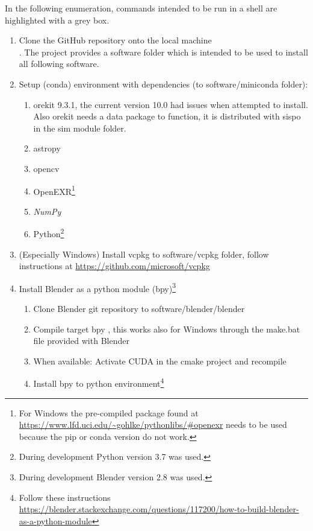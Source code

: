 In the following enumeration, commands intended to be run in a shell are highlighted with a grey box.

\begin{enumerate}
    \item Clone the GitHub repository onto the local machine \\ . The project provides a software folder which is intended to be used to install all following software.
    \item Setup (conda) environment with dependencies (to software/miniconda folder):
    \begin{enumerate}
        \item orekit 9.3.1, the current version 10.0 had issues when attempted to install. Also orekit needs a data package to function, it is distributed with \gls{sispo} in the sim module folder.
        \item astropy
        \item opencv
        \item OpenEXR\footnote{For Windows the pre-compiled package found at \url{https://www.lfd.uci.edu/~gohlke/pythonlibs/\#openexr} needs to be used because the pip or conda version do not work.}
        \item \textit{NumPy}
        \item Python\footnote{During development Python version 3.7 was used.}
    \end{enumerate}{}
    \item (Especially Windows) Install vcpkg to software/vcpkg folder, follow instructions at \url{https://github.com/microsoft/vcpkg}
    \item Install Blender as a python module (bpy)\footnote{During development Blender version 2.8 was used.}
    \begin{enumerate}
        \item Clone Blender git repository to software/blender/blender \\ 
        \item Compile target bpy , this works also for Windows through the make.bat file provided with Blender
        \item When available: Activate CUDA in the cmake project and recompile
        \item Install bpy to python environment\footnote{Follow these instructions \url{https://blender.stackexchange.com/questions/117200/how-to-build-blender-as-a-python-module}}

\end{enumerate}
\end{enumerate}
